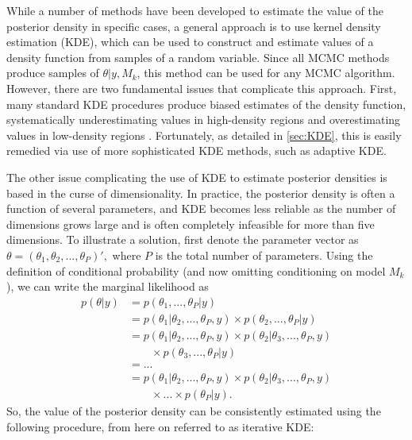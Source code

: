 \documentclass[twocolumn]{article}
\begin{document}
While a number of methods have been developed to estimate the value of the posterior density in specific cases, a general approach is to use kernel density estimation (KDE), which can be used to construct and estimate values of a density function from samples of a random variable. Since all MCMC methods produce samples of $\theta|y, M_k$, this method can be used for any MCMC algorithm. However, there are two fundamental issues that complicate this approach. First, many standard KDE procedures produce biased estimates of the density function, systematically underestimating values in high-density regions and overestimating values in low-density regions \citep{SilvermanDE}. Fortunately, as detailed in \cref{sec:KDE}, this is easily remedied via use of more sophisticated KDE methods, such as adaptive KDE.

The other issue complicating the use of KDE to estimate posterior densities is based in the curse of dimensionality. In practice, the posterior density is often a function of several parameters, and KDE becomes less reliable as the number of dimensions grows large and is often completely infeasible for more than five dimensions. To illustrate a solution, first denote the parameter vector as $\theta = (\theta_1, \theta_2, ..., \theta_P)',$ where $P$ is the total number of parameters. Using the definition of conditional probability (and now omitting conditioning on model $M_k$), we can write the marginal likelihood as
\begin{subequations}
\begin{align}
	p(\theta|y)
	&= p(\theta_1, ..., \theta_P|y) \\
	&= p(\theta_1|\theta_2, ..., \theta_P, y)\times p(\theta_2, ..., \theta_P|y) \\
	&= p(\theta_1|\theta_2, ..., \theta_P, y)\times p(\theta_2|\theta_3, ..., \theta_P, y) \\ &\qquad\times p(\theta_3, ..., \theta_P|y) \\
	&= ... \\
	&= p(\theta_1|\theta_2, ..., \theta_P, y)\times p(\theta_2|\theta_3, ..., \theta_P, y)\\ &\qquad\times ...\times p(\theta_P|y).
\end{align}
\end{subequations}
So, the value of the posterior density can be consistently estimated using the following procedure, from here on referred to as iterative KDE:
\end{document}
